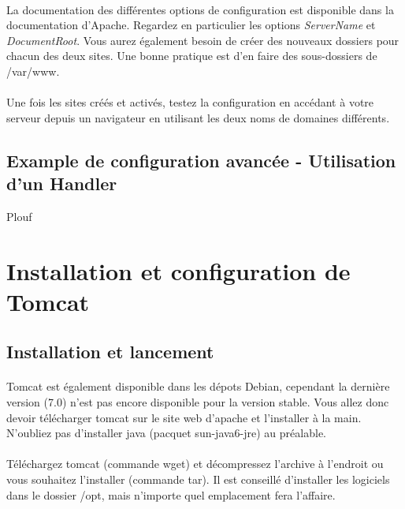 \documentclass[12pt,a4paper]{article}
\begin{document}
\paragraph{}
La documentation des différentes options de configuration est disponible dans la documentation d'Apache. Regardez en particulier les options \textit{ServerName} et \textit{DocumentRoot}. Vous aurez également besoin de créer des nouveaux dossiers pour chacun des deux sites. Une bonne pratique est d'en faire des sous-dossiers de /var/www.

\paragraph{}
Une fois les sites créés et activés, testez la configuration en accédant à votre serveur depuis un navigateur en utilisant les deux noms de domaines différents.

\subsection{Example de configuration avancée - Utilisation d'un Handler}
Plouf

\section{Installation et configuration de Tomcat}

\subsection{Installation et lancement}

\paragraph{}
Tomcat est également disponible dans les dépots Debian, cependant la dernière version (7.0) n'est pas encore disponible pour la version stable. Vous allez donc devoir télécharger tomcat sur le site web d'apache et l'installer à la main. N'oubliez pas d'installer java (pacquet sun-java6-jre) au préalable.

\paragraph{}
Téléchargez tomcat (commande wget) et décompressez l'archive à l'endroit ou vous souhaitez l'installer (commande tar). Il est conseillé d'installer les logiciels dans le dossier /opt, mais n'importe quel emplacement fera l'affaire.
\end{document}
